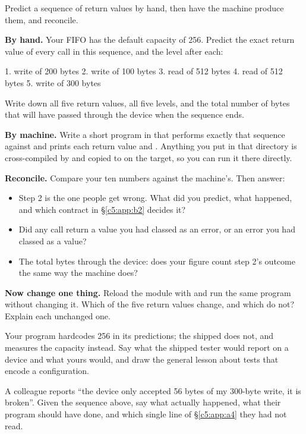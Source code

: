 Predict a sequence of return values by hand, then have the machine produce them, and reconcile.

 \textbf{By hand.} Your FIFO has the default capacity of 256. Predict the exact return
value of every call in this sequence, and the level after each:

\begin{console}
1.  write of 200 bytes
2.  write of 100 bytes
3.  read  of 512 bytes
4.  read  of 512 bytes
5.  write of 300 bytes
\end{console}

\noindent Write down all five return values, all five levels, and the total number of bytes that
will have passed through the device when the sequence ends.

 \textbf{By machine.} Write a short program in  that performs
exactly that sequence against  and prints each return value and .
Anything you put in that directory is cross-compiled by  and copied to 
on the target, so you can run it there directly.

 \textbf{Reconcile.} Compare your ten numbers against the machine's. Then answer:
\begin{itemize}
  \item Step 2 is the one people get wrong. What did you predict, what happened, and which contract
    in \S\ref{c5:app:b2} decides it?
  \item Did any call return a value you had classed as an error, or an error you had classed as a
    value?
  \item The total bytes through the device: does your figure count step 2's outcome the same way the
    machine does?
\end{itemize}

 \textbf{Now change one thing.} Reload the module with  and run the same program without changing it. Which of the five return values change,
and which do not? Explain each unchanged one.

 Your program hardcodes 256 in its predictions; the shipped  does not,
and measures the capacity instead. Say what the shipped tester would report on a 
device and what yours would, and draw the general lesson about tests that encode a configuration.

 A colleague reports ``the device only accepted 56 bytes of my 300-byte write, it is
broken''. Given the sequence above, say what actually happened, what their program should have done,
and which single line of \S\ref{c5:app:a4} they had not read.
